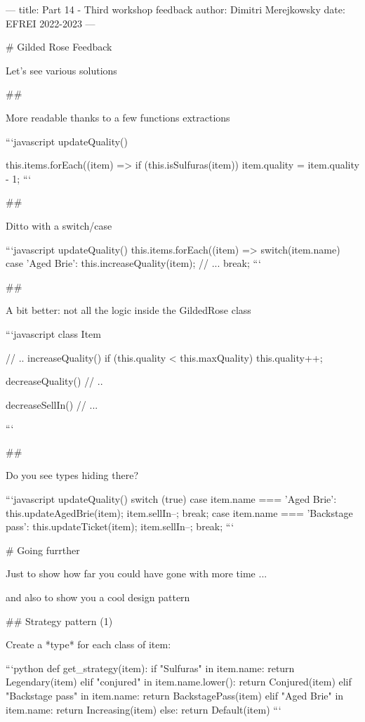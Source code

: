 ---
title: Part 14 - Third workshop feedback
author: Dimitri Merejkowsky
date: EFREI 2022-2023
---

# Gilded Rose Feedback

Let's see various solutions

##

More readable thanks to a few functions extractions

```javascript
updateQuality() {
  this.items.forEach((item) => {
    if (this.isSulfuras(item)) {
      item.quality = item.quality - 1;
    }
}
```

##

Ditto with a switch/case

```javascript
updateQuality() {
  this.items.forEach((item) => {
    switch(item.name) {
      case 'Aged Brie':
        this.increaseQuality(item);
        // ...
        break;
    }
  }
}
```

##

A bit better: not all the logic inside the GildedRose class

```javascript
class Item {
  // ..
  increaseQuality() {
    if (this.quality < this.maxQuality) this.quality++;
  }

  decreaseQuality() {
    // ..
  }

  decreaseSellIn() {
    // ...
  }
}
```

##

Do you see types hiding there?

```javascript
updateQuality() {
  switch (true) {
  case item.name === 'Aged Brie':
    this.updateAgedBrie(item);
    item.sellIn--;
    break;
  case item.name === 'Backstage pass':
    this.updateTicket(item);
    item.sellIn--;
    break;
  }
}
```

# Going furrther

Just to show how far you could have gone with more time ...

\vfill

and also to show you a cool design pattern

## Strategy pattern (1)

Create a *type* for each class of item:

```python
def get_strategy(item):
    if "Sulfuras" in item.name:
        return Legendary(item)
    elif "conjured" in item.name.lower():
        return Conjured(item)
    elif "Backstage pass" in item.name:
        return BackstagePass(item)
    elif "Aged Brie" in item.name:
        return Increasing(item)
    else:
        return Default(item)
```


}
